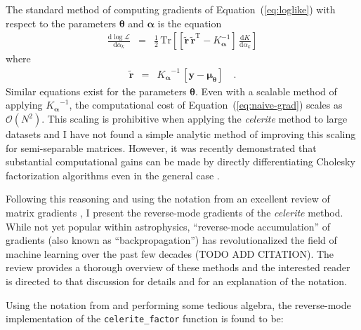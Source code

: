 \documentclass[rnaas]{aastex62}
\renewcommand{\eqref}[1]{\ref{eq:#1}}
\newcommand{\Eq}[1]{Equation~(\eqref{#1})}
\newcommand{\eqlabel}[1]{\label{eq:#1}}
\newcommand{\T}{\ensuremath{\mathrm{T}}}
\newcommand{\dd}{\ensuremath{ \mathrm{d}}}
\newcommand{\bvec}[1]{{\ensuremath{\boldsymbol{#1}}}}
\begin{document}
The standard method of computing gradients of \Eq{loglike} with respect to the
parameters $\bvec{\theta}$ and $\bvec{\alpha}$ is the equation
\citep{Rasmussen:2006}
\begin{eqnarray}\eqlabel{naive-grad}
\frac{\dd \log \mathcal{L}}{\dd \alpha_k} &=&
    \frac{1}{2}\,\mathrm{Tr}\left[
        \left[
        \bvec{\tilde{r}}\,\bvec{\tilde{r}}^\T - {K_\bvec{\alpha}^{-1}}
        \right]
        \,\frac{\dd K}{\dd \alpha_k}
    \right]
\end{eqnarray}
where
\begin{eqnarray}
    \bvec{\tilde{r}} &=&
        {K_\bvec{\alpha}}^{-1}\,\left[\bvec{y}-\bvec{\mu}_\bvec{\theta}\right]
    \quad.
\end{eqnarray}
Similar equations exist for the parameters $\bvec{\theta}$.
Even with a scalable method of applying ${K_\bvec{\alpha}}^{-1}$, the
computational cost of \Eq{naive-grad} scales as $\mathcal{O}(N^2)$.
This scaling is prohibitive when applying the \emph{celerite} method to large
datasets and I have not found a simple analytic method of improving this
scaling for semi-separable matrices.
However, it was recently demonstrated that substantial computational gains can
be made by directly differentiating Cholesky factorization algorithms even in
the general case \citep{Murray:2016}.

Following this reasoning and using the notation from an excellent review of
matrix gradients \citep{Giles:2008}, I present the reverse-mode gradients of
the \emph{celerite} method.
While not yet popular within astrophysics, ``reverse-mode accumulation'' of
gradients (also known as ``backpropagation'') has revolutionalized the field
of machine learning over the past few decades (TODO ADD CITATION).
The review \citep{Giles:2008} provides a thorough overview of these methods
and the interested reader is directed to that discussion for details and for
an explanation of the notation.

Using the notation from \citet{Giles:2008} and performing some tedious
algebra, the reverse-mode implementation of the \texttt{celerite\_factor}
function is found to be:
\end{document}
